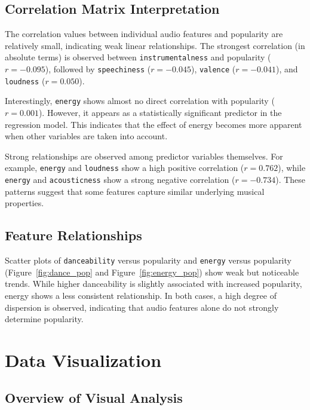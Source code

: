 \documentclass[12pt,a4paper]{article}
\begin{document}
\subsection{Correlation Matrix Interpretation}

The correlation values between individual audio features and popularity
are relatively small, indicating weak linear relationships. The strongest
correlation (in absolute terms) is observed between
\texttt{instrumentalness} and popularity ($r = -0.095$), followed by
\texttt{speechiness} ($r = -0.045$), \texttt{valence} ($r = -0.041$),
and \texttt{loudness} ($r = 0.050$).

Interestingly, \texttt{energy} shows almost no direct correlation with
popularity ($r = 0.001$). However, it appears as a statistically
significant predictor in the regression model. This indicates that the
effect of energy becomes more apparent when other variables are taken
into account.

Strong relationships are observed among predictor variables themselves.
For example, \texttt{energy} and \texttt{loudness} show a high positive
correlation ($r = 0.762$), while \texttt{energy} and
\texttt{acousticness} show a strong negative correlation
($r = -0.734$). These patterns suggest that some features capture similar
underlying musical properties.

\subsection{Feature Relationships}

Scatter plots of \texttt{danceability} versus popularity and
\texttt{energy} versus popularity (Figure~\ref{fig:dance_pop} and 
Figure~\ref{fig:energy_pop}) show weak but
noticeable trends. While higher danceability is slightly associated with
increased popularity, energy shows a less consistent relationship. In
both cases, a high degree of dispersion is observed, indicating that
audio features alone do not strongly determine popularity.

\section{Data Visualization}

\subsection{Overview of Visual Analysis}
\end{document}
